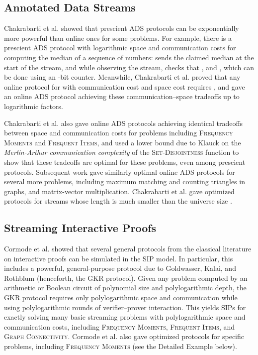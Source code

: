 \documentclass[11pt, letterpaper]{article}
\begin{document}
\subsection{Annotated Data Streams}
\label{sec:ads}
Chakrabarti et al. \cite{icalp} showed that prescient ADS protocols can be exponentially more powerful than online ones for some problems. 
For example, there is a prescient ADS protocol with logarithmic space and communication costs for computing the median of a sequence of numbers:  sends  the claimed median  at the start of the stream, and while observing the stream,  checks that , and , which can be done using an -bit counter. Meanwhile, Chakrabarti et al. \cite{icalp} proved that any online protocol for  with communication
cost  and space cost  requires , and gave an online ADS protocol achieving these communication--space tradeoffs up to logarithmic factors.

Chakrabarti et al. \cite{icalp} also gave online ADS protocols achieving identical tradeoffs between space and communication costs for problems including \textsc{Frequency Moments} and \textsc{Frequent Items}, and used a lower bound  due to Klauck \cite{Klauck03} on the \emph{Merlin-Arthur communication complexity} of the \textsc{Set-Disjointness} function to show that these tradeoffs are optimal for these problems, even among prescient protocols. 
Subsequent work \cite{esa, semistreaming} gave similarly optimal online ADS protocols for several more problems, including maximum matching and counting triangles in graphs, and matrix-vector multiplication. Chakrabarti et al. \cite{soda} gave optimized protocols for streams whose
length  is much smaller than the universe size .



\subsection{Streaming Interactive Proofs}
Cormode et al. \cite{vldb} showed that several general protocols from the classical literature on interactive proofs can be simulated in the SIP model. 
In particular, this includes a
powerful, general-purpose protocol due to Goldwasser, Kalai, and Rothblum \cite{gkr} (henceforth, the GKR protocol). Given any problem 
computed by an arithmetic or Boolean circuit of polynomial size and polylogarithmic depth,
the GKR protocol requires only polylogarithmic space and communication while using polylogarithmic
rounds of verifier--prover interaction. This yields SIPs for exactly solving many basic streaming problems with
polylogarithmic space and communication costs, including \textsc{Frequency Moments}, \textsc{Frequent Items}, and \textsc{Graph Connectivity}.
Cormode et al. \cite{vldb} also gave optimized protocols for specific problems, including \textsc{Frequency Moments} (see the Detailed Example below).
\end{document}
